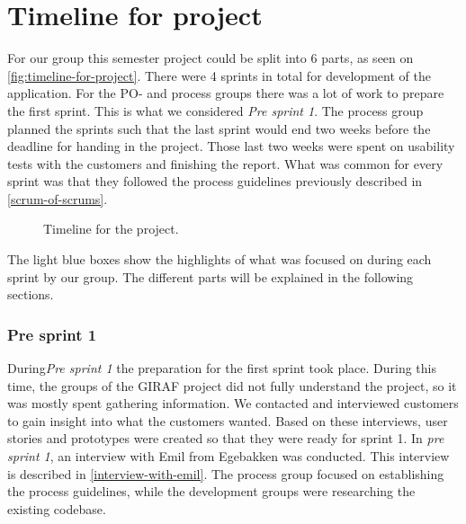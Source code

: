 \section{Timeline for project}
For our group this semester project could be split into 6 parts, as seen on \autoref{fig:timeline-for-project}.
There were 4 sprints in total for development of the application. 
For the PO- and process groups there was a lot of work to prepare the first sprint.
This is what we considered \textit{Pre sprint 1}.
The process group planned the sprints such that the last sprint would end two weeks before the deadline for handing in the project.
Those last two weeks were spent on usability tests with the customers and finishing the report.
What was common for every sprint was that they followed the process guidelines previously described in \autoref{scrum-of-scrums}.

\begin{figure}[H]
    \caption{\label{fig:timeline-for-project} Timeline for the project.}
\end{figure}

\noindent The light blue boxes show the highlights of what was focused on during each sprint by our group.
The different parts will be explained in the following sections.

\subsubsection{Pre sprint 1}
During\textit{Pre sprint 1} the preparation for the first sprint took place.
During this time, the groups of the GIRAF project did not fully understand the project, so it was mostly spent gathering information.
We contacted and interviewed customers to gain insight into what the customers wanted.
Based on these interviews, user stories and prototypes were created so that they were ready for sprint 1.
In \textit{pre sprint 1}, an interview with Emil from Egebakken was conducted. 
This interview is described in \autoref{interview-with-emil}.
The process group focused on establishing the process guidelines, while the development groups were researching the existing codebase.

